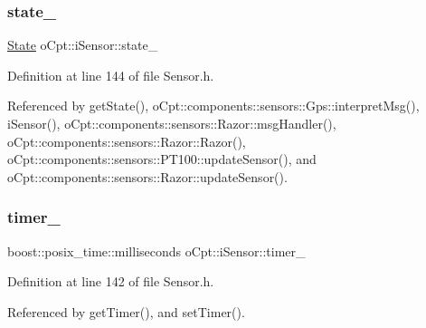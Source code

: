 \hypertarget{classo_cpt_1_1i_sensor_ad27fe02a89f013951a05f296ec457a08}{}\label{classo_cpt_1_1i_sensor_ad27fe02a89f013951a05f296ec457a08} 
\subsubsection{\texorpdfstring{state\+\_\+}{state\_}}
{\footnotesize\ttfamily \hyperlink{structo_cpt_1_1i_sensor_1_1_state}{State} o\+Cpt\+::i\+Sensor\+::state\+\_\+\hspace{0.3cm}{\ttfamily [protected]}}



Definition at line 144 of file Sensor.\+h.



Referenced by get\+State(), o\+Cpt\+::components\+::sensors\+::\+Gps\+::interpret\+Msg(), i\+Sensor(), o\+Cpt\+::components\+::sensors\+::\+Razor\+::msg\+Handler(), o\+Cpt\+::components\+::sensors\+::\+Razor\+::\+Razor(), o\+Cpt\+::components\+::sensors\+::\+P\+T100\+::update\+Sensor(), and o\+Cpt\+::components\+::sensors\+::\+Razor\+::update\+Sensor().

\hypertarget{classo_cpt_1_1i_sensor_ac2a089853910118f6b490c00fc354d77}{}\label{classo_cpt_1_1i_sensor_ac2a089853910118f6b490c00fc354d77} 
\subsubsection{\texorpdfstring{timer\+\_\+}{timer\_}}
{\footnotesize\ttfamily boost\+::posix\+\_\+time\+::milliseconds o\+Cpt\+::i\+Sensor\+::timer\+\_\+\hspace{0.3cm}{\ttfamily [protected]}}



Definition at line 142 of file Sensor.\+h.



Referenced by get\+Timer(), and set\+Timer().

\hypertarget{classo_cpt_1_1i_sensor_a37396b5c63f5e99cb6e80c266f85dbfa}{}\label{classo_cpt_1_1i_sensor_a37396b5c63f5e99cb6e80c266f85dbfa} 
